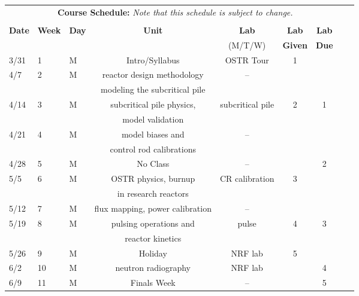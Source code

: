 \documentclass[11pt, a4paper]{article}
\begin{document}
\pagebreak
\FloatBarrier
\renewcommand{\arraystretch}{1}
\begin{table}[h]
\begin{center}
\begin{tabular}{lllcccccc}
\multicolumn{8}{c}{\textbf{Course Schedule:}\textit{ Note that this schedule is
subject to change.}}\\
&&&&&&&&\\
\textbf{Date} & \textbf{Week} & \textbf{Day} & \textbf{Unit} & \textbf{Lab} & \textbf{Lab}& \textbf{Lab} \\
              &  &  &  & (M/T/W)  & \textbf{Given} & \textbf{Due}\\ \hline
\hline
3/31 & 1 & M & Intro/Syllabus  & OSTR Tour & 1  &   \\
4/7 & 2 & M & reactor design methodology\/ & -- &  &  \\
 & & & modeling the subcritical pile & & & \\
4/14 & 3 & M & subcritical pile physics,& subcritical pile & 2 & 1\\
 & & & model validation & & & \\
4/21 & 4 & M & model biases and    & -- &  &  \\
 & & & control rod calibrations & & & \\
4/28 & 5 & M & No Class                & -- &  & 2 \\
5/5 & 6 & M & OSTR physics, burnup        & CR calibration & 3  &  \\
 & & & in research reactors & & & \\
5/12 & 7 & M & flux mapping, power calibration & -- &  &  \\
5/19 & 8 & M & pulsing operations and        & pulse & 4  & 3 \\
 & & & reactor kinetics & & & \\
5/26 & 9 & M & Holiday                    & NRF lab & 5 &  \\
6/2 & 10 & M & neutron radiography        & NRF lab &  & 4\\
6/9 & 11 & M & Finals Week                & --  &  & 5  \\
\end{tabular}
\end{center}
\end{table}
\FloatBarrier



\end{document}
